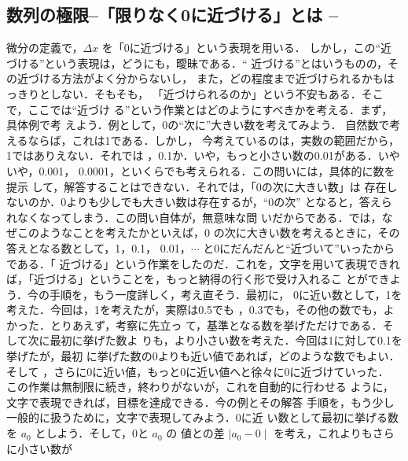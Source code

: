             \subsection{数列の極限\;\;--「限りなく0に近づける」とは --}
                微分の定義で，$\Delta x$ を「0に近づける」という表現を用いる．
                しかし，この“近づける”という表現は，どうにも，曖昧である．“
                近づける”とはいうものの，その近づける方法がよく分からないし，
                また，どの程度まで近づけられるかもはっきりとしない．そもそも，
                「近づけられるのか」という不安もある．そこで，ここでは“近づけ
                る”という作業とはどのようにすべきかを考える．まず，具体例で考
                えよう．例として，0の“次に”大きい数を考えてみよう．
                自然数で考えるならば，これは1である．しかし，
                今考えているのは，実数の範囲だから，1ではありえない．それでは
                ，0.1か．いや，もっと小さい数の0.01がある．いやいや，0.001，
                0.0001，といくらでも考えられる．この問いには，具体的に数を提示
                して，解答することはできない．それでは，「0の次に大きい数」は
                存在しないのか．0よりも少しでも大きい数は存在するが，“0の次”
                となると，答えられなくなってしまう．この問い自体が，無意味な問
                いだからである．では，なぜこのようなことを考えたかといえば，0
                の次に大きい数を考えるときに，その答えとなる数として，1，0.1，
                0.01，$\cdots$ と0にだんだんと“近づいて”いったからである．「
                近づける」という作業をしたのだ．これを，文字を用いて表現できれ
                ば，「近づける」ということを，もっと納得の行く形で受け入れるこ
                とができよう．今の手順を，もう一度詳しく，考え直そう．最初に，
                0に近い数として，1を考えた．今回は，1を考えたが，実際は0.5でも
                ，0.3でも，その他の数でも，よかった．とりあえず，考察に先立っ
                て，基準となる数を挙げただけである．そして次に最初に挙げた数よ
                りも，より小さい数を考えた．今回は1に対して0.1を挙げたが，最初
                に挙げた数の0よりも近い値であれば，どのような数でもよい．そして
                ，さらに0に近い値，もっと0に近い値へと徐々に0に近づけていった．
                この作業は無制限に続き，終わりがないが，これを自動的に行わせる
                ように，文字で表現できれば，目標を達成できる．今の例とその解答
                手順を，もう少し一般的に扱うために，文字で表現してみよう．0に近
                い数として最初に挙げる数を $a_{0}$ としよう．そして，0と $a_{0}$ の
                値との差 $\mid a_{0}-0 \mid$ を考え，これよりもさらに小さい数が
